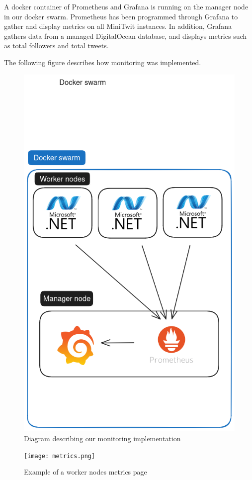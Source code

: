 A docker container of Prometheus and Grafana is running on the manager node in our docker swarm.
Prometheus has been programmed through Grafana to gather and display metrics on all MiniTwit instances.%
In addition, Grafana gathers data from a managed DigitalOcean database, and displays metrics such as total followers and total tweets.

The following figure describes how monitoring was implemented.

\begin{figure}[H]
	\centering
	\includegraphics[width=1\textwidth]{Monitoring2.png}
	\caption{Diagram describing our monitoring implementation}
	\label{fig:Monitoring2}
\end{figure}
\begin{figure}[H]
	\centering
	\texttt{[image: metrics.png]}
	\caption{Example of a worker nodes metrics page}
	\label{fig:metrics}
\end{figure}

